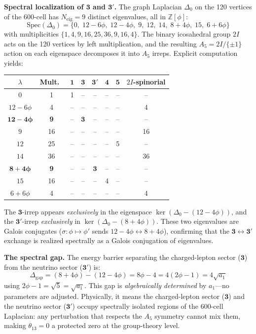 \documentclass[12pt,a4paper]{article}
\theoremstyle{definition}
\begin{document}
\textbf{Spectral localization of $\mathbf{3}$ and $\mathbf{3'}$.}
The graph Laplacian $\Delta_0$ on the 120 vertices of the 600-cell has $N_{\text{eig}} = 9$ distinct eigenvalues, all in $\mathbb{Z}[\phi]$:
\begin{equation}
\mathrm{Spec}(\Delta_0) = \{0,\; 12\!-\!6\phi,\; 12\!-\!4\phi,\; 9,\; 12,\; 14,\; 8\!+\!4\phi,\; 15,\; 6\!+\!6\phi\}
\end{equation}
with multiplicities $\{1,4,9,16,25,36,9,16,4\}$.  The binary icosahedral group $2I$ acts on the 120 vertices by left multiplication, and the resulting $A_5 = 2I/\{\pm 1\}$ action on each eigenspace decomposes it into $A_5$ irreps.  Explicit computation yields:
\begin{center}
\renewcommand{\arraystretch}{1.1}
\begin{tabular}{cccccccc}
\toprule
$\lambda$ & Mult.\ & $\mathbf{1}$ & $\mathbf{3}$ & $\mathbf{3'}$ & $\mathbf{4}$ & $\mathbf{5}$ & $2I$-spinorial \\
\midrule
$0$ & 1 & 1 & -- & -- & -- & -- & -- \\
$12\!-\!6\phi$ & 4 & -- & -- & -- & -- & -- & 4 \\
$\mathbf{12\!-\!4\phi}$ & \textbf{9} & -- & $\mathbf{3}$ & -- & -- & -- & -- \\
$9$ & 16 & -- & -- & -- & -- & -- & 16 \\
$12$ & 25 & -- & -- & -- & -- & 5 & -- \\
$14$ & 36 & -- & -- & -- & -- & -- & 36 \\
$\mathbf{8\!+\!4\phi}$ & \textbf{9} & -- & -- & $\mathbf{3}$ & -- & -- & -- \\
$15$ & 16 & -- & -- & -- & 4 & -- & -- \\
$6\!+\!6\phi$ & 4 & -- & -- & -- & -- & -- & 4 \\
\bottomrule
\end{tabular}
\end{center}
\noindent The $\mathbf{3}$-irrep appears \emph{exclusively} in the eigenspace $\ker(\Delta_0 - (12-4\phi))$, and the $\mathbf{3'}$-irrep \emph{exclusively} in $\ker(\Delta_0 - (8+4\phi))$.  These two eigenvalues are Galois conjugates ($\sigma: \phi \mapsto \phi'$ sends $12-4\phi \leftrightarrow 8+4\phi$), confirming that the $\mathbf{3} \leftrightarrow \mathbf{3'}$ exchange is realized spectrally as a Galois conjugation of eigenvalues.

\textbf{The spectral gap.}  The energy barrier separating the charged-lepton sector ($\mathbf{3}$) from the neutrino sector ($\mathbf{3'}$) is:
\begin{equation}
\Delta_{\text{gap}} = (8+4\phi) - (12-4\phi) = 8\phi - 4 = 4(2\phi - 1) = 4\sqrt{a_1}
\label{eq:spectral_gap}
\end{equation}
using $2\phi - 1 = \sqrt{5} = \sqrt{a_1}$.  This gap is \emph{algebraically determined} by $a_1$---no parameters are adjusted.  Physically, it means the charged-lepton sector ($\mathbf{3}$) and the neutrino sector ($\mathbf{3'}$) occupy spectrally isolated regions of the 600-cell Laplacian: any perturbation that respects the $A_5$ symmetry cannot mix them, making $\theta_{13} = 0$ a protected zero at the group-theory level.
\end{document}
